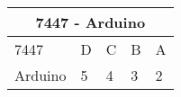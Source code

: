 \label{table-3}
\begin{tabular}{|p{3cm}|p{1cm}|p{1cm}|p{1cm}|p{1cm}|}                                                                
	\hline
	\multicolumn{5}{|c|}{7447 - Arduino}\\                                                                  \hline                                               
	7447& D& C& B& A\\                                                                                       
	\hline                                               
	Arduino& 5& 4& 3& 2\\                                                                                    
	\hline                                       
\end{tabular}
